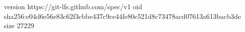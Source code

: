 version https://git-lfs.github.com/spec/v1
oid sha256:e04d6e56e83c62f3cbbe437c9ce44fe80c521d8c73478acd07613a613bacb3de
size 27229

